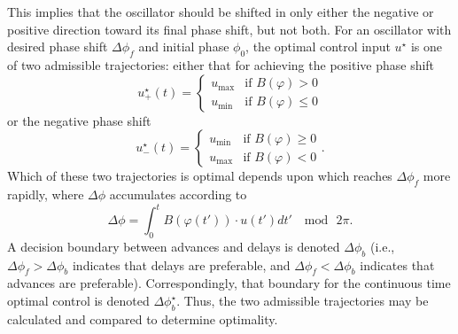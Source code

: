 This implies that the oscillator should be shifted in only either the negative or positive direction toward its final phase shift, but not both.
For an oscillator with desired phase shift $\Delta\phi_f$ and initial phase $\phi_0$, the optimal control input $u^\star$ is one of two admissible trajectories: either that for achieving the positive phase shift
\begin{equation}
    u^\star_{+}(t) = \begin{cases}u_{\max} &\mbox{if } B(\varphi) >0 \\
        u_{\min} & \mbox{if } B(\varphi) \leq0 \end{cases}
\end{equation}
or the negative phase shift
\begin{equation}
    u^\star_{-}(t) = \begin{cases}u_{\min} &\mbox{if } B(\varphi) \geq0 \\
        u_{\max} & \mbox{if } B(\varphi) <0 \end{cases}.
\end{equation}
Which of these two trajectories is optimal depends upon which reaches $\Delta\phi_f$ more rapidly, where $\Delta\phi$ accumulates according to
\begin{equation}\label{eq:delphi}
    \Delta\phi = \int_0^{t}B(\varphi(t'))\cdot u(t')dt'\; \mod\,2\pi.
\end{equation}
A decision boundary between advances and delays is denoted $\Delta\phi_b$ (i.e., $\Delta\phi_f > \Delta\phi_b$ indicates that delays are preferable, and $\Delta\phi_f < \Delta\phi_b$ indicates that advances are preferable).
Correspondingly, that boundary for the continuous time optimal control is denoted $\Delta\phi^\star_b$.
Thus, the two admissible trajectories may be calculated and compared to determine optimality.

